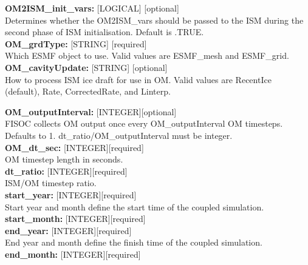 \documentclass[12pt]{article}
\begin{document}
\begin{flushleft}
\vspace{6pt}
\textbf{OM2ISM\_init\_vars:}  [LOGICAL] [optional]                         \\
Determines whether the OM2ISM\_vars should be passed to the ISM during the 
second phase of ISM initialisation.   Default is .TRUE.                    \\ 
\vspace{6pt}
\textbf{OM\_grdType:}        [STRING] [required]                           \\
Which ESMF object to use.  Valid values are ESMF\_mesh and ESMF\_grid.     \\
\vspace{6pt}
\textbf{OM\_cavityUpdate:}   [STRING] [optional]                           \\
How to process ISM ice draft for use in OM.  Valid values are RecentIce    \\
(default), Rate, CorrectedRate, and Linterp.                               \\
\vspace{6pt}
\vspace{6pt}

\textbf{OM\_outputInterval:} [INTEGER][optional]                           \\
FISOC collects OM output once every OM\_outputInterval OM timesteps. 
Defaults to 1.  dt\_ratio/OM\_outputInterval must be integer.              \\
\vspace{6pt}
\textbf{OM\_dt\_sec:}         [INTEGER][required]                          \\
OM timestep length in seconds.                                             \\
\vspace{6pt}
\textbf{dt\_ratio:}          [INTEGER][required]                           \\
ISM/OM timestep ratio.                                                     \\
\vspace{6pt}
\textbf{start\_year:}        [INTEGER][required]                           \\
Start year and month define the start time of the coupled simulation.      \\
\vspace{6pt}
\textbf{start\_month:}       [INTEGER][required]                           \\
\vspace{6pt}
\textbf{end\_year:}          [INTEGER][required]                           \\
End year and month define the finish time of the coupled simulation.       \\
\vspace{6pt}
\textbf{end\_month:}         [INTEGER][required]                           \\
\vspace{6pt}
\vspace{6pt}


\end{flushleft}
\end{document}
